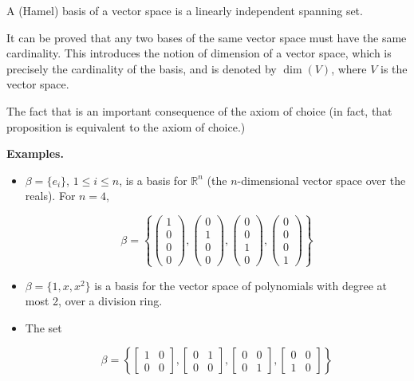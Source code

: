 \documentclass{article}
\begin{document}

A (Hamel) basis of a vector space is a linearly independent spanning set.

It can be proved that any two bases of the same vector space must have the same cardinality. This introduces the notion of dimension of a vector space, which is precisely the cardinality of the basis, and is denoted by $\operatorname{dim}(V)$, where $V$ is the vector space.

The fact that  is an important consequence of the axiom of choice (in fact, that proposition is equivalent to the axiom of choice.)

{\bf Examples.}

\begin{itemize}

\item $\beta = \{e_i\}$, $1\le i \le n$, is a basis for $\mathbb{R}^n$ (the $n$-dimensional vector space over the reals).  For $n=4$, 

$$ \beta = \left\{ \begin{pmatrix} 1 \\ 0 \\ 0 \\ 0 \end{pmatrix} ,
\begin{pmatrix} 0 \\ 1 \\ 0 \\ 0 \end{pmatrix} ,
\begin{pmatrix} 0 \\ 0 \\ 1 \\ 0 \end{pmatrix} ,
\begin{pmatrix} 0 \\ 0 \\ 0 \\ 1 \end{pmatrix} \right\}   $$

\item $ \beta = \{ 1, x , x^2 \} $ is a basis for the vector space of polynomials with degree at most 2, over a division ring.

\item The set

$$ \beta =   
\left\{ \begin{bmatrix}1 & 0 \\ 0 & 0 \end{bmatrix} ,
\begin{bmatrix}0 & 1 \\ 0 & 0 \end{bmatrix} ,
\begin{bmatrix}0 & 0 \\ 0 & 1 \end{bmatrix} ,
\begin{bmatrix}0 & 0 \\ 1 & 0 \end{bmatrix} \right\} $$ 


\end{itemize}
\end{document}
